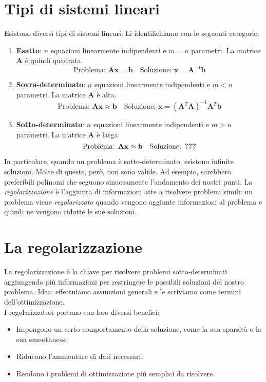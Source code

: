 \documentclass{article}
\begin{document}
    \section{Tipi di sistemi lineari}
        Esistono diversi tipi di sistemi lineari. Li identifichiamo con le seguenti categorie:
        \begin{enumerate}
            \item \textbf{Esatto}: $n$ equazioni linearmente indipendenti e $m=n$ parametri. La matrice $\mathbf{A}$ è quindi quadrata.
                \[\text{Problema: } \mathbf{Ax}=\mathbf{b} \quad \text{Soluzione: }\mathbf{x} = \mathbf{A}^{-1}\mathbf{b} \]
            \item \textbf{Sovra-determinato}: $n$ equazioni linearmente indipendenti e $m<n$ parametri. La matrice $\mathbf{A}$ è alta.
                \[\text{Problema: } \mathbf{Ax} \approx \mathbf{b} \quad \text{Soluzione: }\mathbf{x} = (\mathbf{A}^T\mathbf{A})^{-1}\mathbf{A}^T\mathbf{b} \]
            \item \textbf{Sotto-determinato}: $n$ equazioni linearmente indipendenti e $m>n$ parametri. La matrice $\mathbf{A}$ è larga.
                \[\text{Problema: } \mathbf{Ax} \approx \mathbf{b} \quad \text{Soluzione: \textbf{???}} \]
        \end{enumerate}
        In particolare, quando un problema è sotto-determinato, esistono infinite soluzioni. Molte di queste, però, non sono valide. Ad esempio, 
        sarebbero preferibili polinomi che seguono sinuosamente l'andamento dei nostri punti. La \emph{regolarizzazione} è l'aggiunta di 
        informazioni atte a risolvere problemi simili: un problema viene \emph{regolarizzato} quando vengono aggiunte informazioni al 
        problema e quindi ne vengono ridotte le sue soluzioni. 
    \section{La regolarizzazione}
        La regolarizzazione è la chiave per risolvere problemi sotto-determinati aggiungendo più informazioni per restringere le possibili 
        soluzioni del nostro problema. Idea: effettuiamo assunzioni generali e le scriviamo come termini dell'ottimizzazione. \\
        I regolarizzatori portano con loro diversi benefici:
        \begin{itemize}
            \item Impongono un certo comportamento della soluzione, come la sua sparsità o la sua smoothness;
            \item Riducono l'ammontare di dati necessari;
            \item Rendono i problemi di ottimizzazione più semplici da risolvere.
        \end{itemize}
\end{document}
